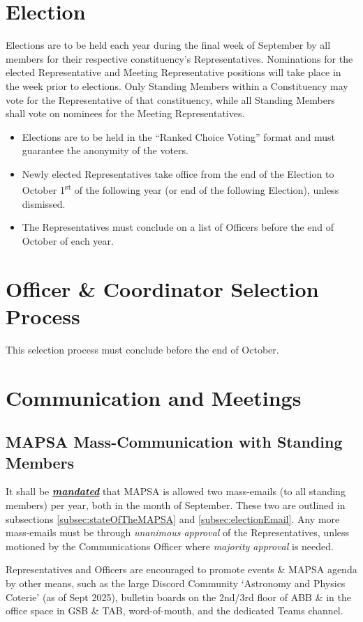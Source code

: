 \documentclass[8pt]{article}
\begin{document}
	\section{Election}\label{sec:elections}
	Elections are to be held each year during the final week of September by all members for their respective constituency's Representatives. Nominations for the elected Representative and Meeting Representative positions will take place in the week prior to elections. Only Standing Members within a Constituency may vote for the Representative of that constituency, while all Standing Members shall vote on nominees for the Meeting Representatives. 
	\begin{itemize}	
		\item Elections are to be held in the ``Ranked Choice Voting'' format and must guarantee the anonymity of the voters. 
		\item Newly elected Representatives take office from the end of the Election to October 1\textsuperscript{st} of the following year (or end of the following Election), unless dismissed.
		\item The Representatives must conclude on a list of Officers before the end of October of each year.
	\end{itemize}
	\section{Officer \& Coordinator Selection Process}
	This selection process must conclude before the end of October.
	
	\section{Communication and Meetings}
	\subsection{MAPSA Mass-Communication with Standing Members}
	It shall be \textbf{\textit{\underline{mandated}}} that MAPSA is allowed two mass-emails (to all standing members) per year, both in the month of September. These two are outlined in subsections \ref{subsec:stateOfTheMAPSA} and \ref{subsec:electionEmail}. Any more mass-emails must be through \textit{unanimous approval} of the Representatives, unless motioned by the Communications Officer where \textit{majority approval} is needed.
	
	Representatives and Officers are encouraged to promote events \& MAPSA agenda by other means, such as the large Discord Community `Astronomy and Physics Coterie' (as of Sept 2025), bulletin boards on the 2nd/3rd floor of ABB \& in the office space in GSB \& TAB, word-of-mouth, and the dedicated Teams channel.
	
\end{document}
